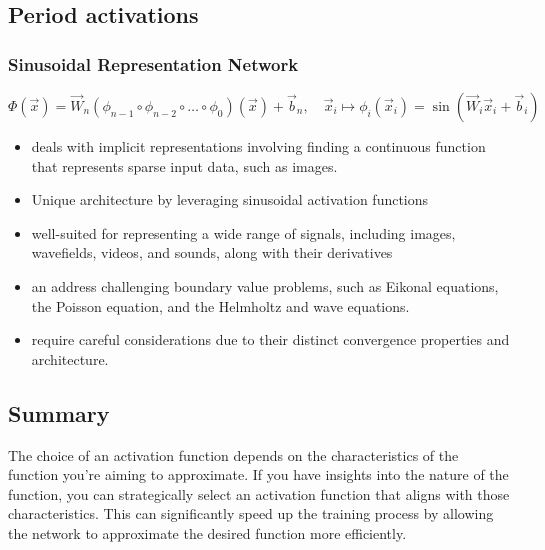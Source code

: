 \documentclass[11pt]{article}
\begin{document}
\subsection{Period activations}

\subsubsection{Sinusoidal Representation Network}

\begin{definition}\label{eq:activation-siren}
    \begin{equation*}
        \Phi(\vec{x}) = \vec{W}_n(\phi_{n-1}\circ \phi_{n-2} \circ \ldots \circ \phi_{0})(\vec{x}) + \vec{b}_n, \quad \vec{x}_i \mapsto \phi_i(\vec{x}_i) = \sin(\vec{W}_i \vec{x}_i + \vec{b}_i)
    \end{equation*}
\end{definition}

\begin{itemize}
    \item deals with implicit representations involving finding a continuous function that represents sparse input data, such as images.
    \item Unique architecture by leveraging sinusoidal activation functions 
    \item well-suited for representing a wide range of signals, including images, wavefields, videos, and sounds, along with their derivatives
    \item an address challenging boundary value problems, such as Eikonal equations, the Poisson equation, and the Helmholtz and wave equations. 
    \item require careful considerations due to their distinct convergence properties and architecture.
\end{itemize}

\subsection{Summary}

The choice of an activation function depends on the characteristics of the function you're aiming to approximate. If you have insights into the nature of the function, you can strategically select an activation function that aligns with those characteristics. This can significantly speed up the training process by allowing the network to approximate the desired function more efficiently. 
\end{document}
